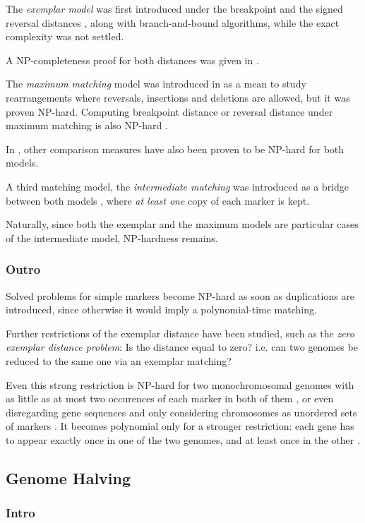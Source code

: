 \documentclass[11pt,final,twoside,nofrench]{thlifl}
\begin{document}
The \emph{exemplar model} was first introduced under the breakpoint and the signed reversal distances \cite{S99}, along with branch-and-bound algorithms, while the exact complexity was not settled.

A NP-completeness proof for both distances was given in \cite{B00}.

The \emph{maximum matching} model was introduced in \cite{BFC04} as a mean to study rearrangements where reversals, insertions and deletions are allowed, but it was proven NP-hard.
Computing breakpoint distance or reversal distance under maximum matching is also NP-hard \cite{C05}.

In \cite{BCFRV07}, other comparison measures have also been proven to be NP-hard for both models.

A third matching model, the \emph{intermediate matching} was introduced as a bridge between both models \cite{A07}, where \emph{at least one} copy of each marker is kept.

Naturally, since both the exemplar and the maximum models are particular cases of the intermediate model, NP-hardness remains.

\subsubsection*{Outro}

Solved problems for simple markers become NP-hard as soon as duplications are introduced, since otherwise it would imply a polynomial-time matching.

Further restrictions of the exemplar distance have been studied, such as the \emph{zero exemplar distance problem}: Is the distance equal to zero? i.e. can two genomes be reduced to the same one via an exemplar matching?

Even this strong restriction is NP-hard for two monochromosomal genomes with as little as at most two occurences of each marker in both of them \cite{BFSV09}, or even disregarding gene sequences and only considering chromosomes as unordered sets of markers \cite{J11}.
It becomes polynomial only for a stronger restriction: each gene has to appear exactly once in one of the two genomes, and at least once in the other \cite{J11}.

\subsection{Genome Halving}

\subsubsection*{Intro}
\end{document}
